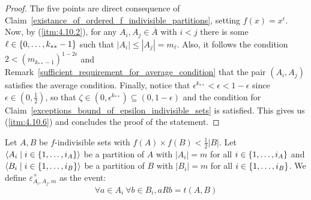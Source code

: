        \begin{proof}
            The five points are direct consequence of Claim~\ref{existance_of_ordered_f_indivisible_partitions},
            setting $f(x) = x^\epsilon$.
            Now, by (\ref{itm:4.10.2}), for any $A_i, A_j \in \overline{A}$ with $i < j$
            there is some $\ell \in \left\{ 0, \dots, k_{**}-1 \right\}$ such that $|A_i| \leq |A_j| = m_\ell$.
            Also, it follows the condition $2 < (m_{k_{**}-1})^{1-2\epsilon}$ and Remark~\ref{sufficient_requirement_for_average_condition}
            that the pair $(A_i,A_j)$ satisfies the average condition.
            Finally, notice that $\epsilon^{k_{**}} < \epsilon < 1 - \epsilon$ since $\epsilon \in (0, \frac{1}{2})$,
            so that $\zeta \in (0, \epsilon ^ {k_{**}}) \subseteq (0, 1 - \epsilon)$ and the condition for
            Claim~\ref{exceptions_bound_of_epsilon_indivisible_sets} is satisfied.
            This gives us (\ref{itm:4.10.6}) and concludes the proof of the statement.
        \end{proof}

        Let $A, B$ be $f$-indivisible sets with $f(A) \times f(B) < \frac{1}{2} |B|$.
        Let $\left< A_i \mid i \in \left\{ 1, \dots, i_A \right\} \right>$ be a partition of $A$ with $|A_i| = m$ for all
        $i \in \left\{ 1, \dots, i_A \right\}$ and $\left< B_i \mid i \in \left\{ 1, \dots, i_B \right\} \right>$ be a partition of
        $B$ with $|B_i| = m$ for all $i \in \left\{ 1, \dots, i_B \right\}$.
        We define $\varepsilon^+_{A_i,A_j,m}$ as the event:
        \[
            \forall a \in A_i \ \forall b \in B_i, a R b = t(A,B)
        \]

